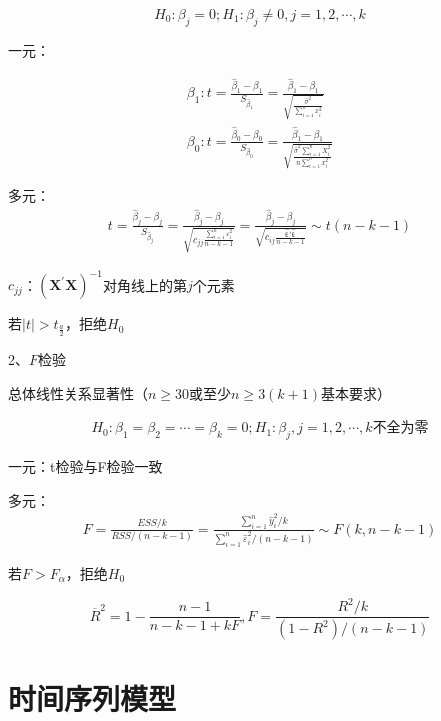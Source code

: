 \documentclass[12pt]{book}
\begin{document}
$$
H_0:\beta_j=0; H_1:\beta_j\neq 0, j=1,2,\cdots,k
$$

一元：

\begin{gather*}
\beta_1:
t
=\frac{\hat{\beta}_1-\beta_1}{S_{\hat{\beta}_1}} 
=\frac{\hat{\beta}_1-\beta_1}{\sqrt{\frac{\hat{\sigma}^2}{\sum_{i=1}^{n}{x_i^2}}}}\\
\beta_0: 
t
=\frac{\hat{\beta}_0-\beta_0}{S_{\hat{\beta}_0}} 
=\frac{\hat{\beta}_1-\beta_1}{\sqrt{\frac{\hat{\sigma}^2\sum_{i=1}^{n}{X_i^2}}{n \sum_{i=1}^{n}{x_i^2}}}}
\end{gather*}


多元：
\begin{gather*}
    t=\frac{\hat{\beta}_j-\beta_j}{S_{\hat{\beta}_j}} =\frac{\hat{\beta}_j-\beta_j}{\sqrt{c_{jj}\frac{\sum_{i=1}^{n}{\varepsilon_i^2}}{n -k-1}}} =\frac{\hat{\beta}_j-\beta_j}{\sqrt{c_{ij}\frac{\bm{\hat{\varepsilon}}' \bm{ \hat{\varepsilon}}}{n -k-1}}} \sim t(n-k-1)
\end{gather*}


$c_{jj}$：$\left(\bm{X}^\prime\bm{X}\right)^{-1}$对角线上的第$j$个元素

若$\left|t\right|>t_{\frac{a}{2}}$，拒绝$H_0$

2、$F$检验

总体线性关系显著性（$n\geq 30$或至少$n\geq3\left(k+1\right)$基本要求）

\begin{gather*}
    H_0:\beta_1=\beta_2=\cdots=\beta_k=0;H_1:\beta_{j}, j=1,2,\cdots,k\text{不全为零}
\end{gather*}


一元：t检验与F检验一致

多元：
\begin{gather*}
F=\frac{ESS/k}{RSS/(n-k-1)} = \frac{\sum_{i=1}^{n}{\hat{y}_i^2/k}}{\sum_{i=1}^{n}{\hat{\varepsilon}_i^2/(n-k-1)}}\sim F(k,n-k-1)
\end{gather*}


若$F>F_\alpha$，拒绝$H_0$

$$
{\overline{R}}^2=1-\frac{n-1}{n-k-1+kF}, F=\frac{R^2/k}{(1-R^2)/(n-k-1)}
$$












\section{时间序列模型}
\end{document}
